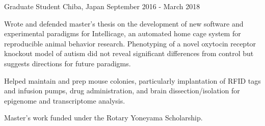\begin{cventries}
    {Graduate Student}
    {Chiba, Japan}
    {September 2016 - March 2018}
    {\begin{cvitems}
        \item{
            {Wrote} and 
            {defended} master's thesis on the development of new software and
            experimental paradigms for Intellicage, an automated home cage system for
            reproducible animal behavior research. Phenotyping of a novel oxytocin
            receptor knockout model of autism did not reveal significant differences
            from control but suggests directions for future paradigms.\vspace*{0.1cm}}
        \item{Helped maintain and prep mouse colonies, particularly implantation of RFID
            tags and infusion pumps, drug administration, and brain dissection/isolation
            for epigenome and transcriptome analysis.\vspace*{0.1cm}}
        \item{Master's work funded under the Rotary Yoneyama 
            {Scholarship}.}
    \end{cvitems}}
    \vspace*{0.2cm}
    

\end{cventries}
